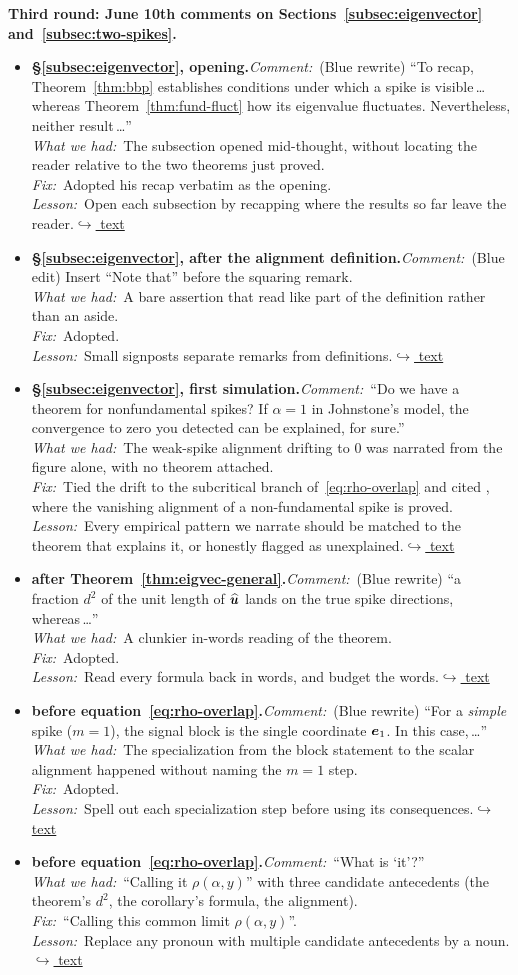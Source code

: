 \documentclass[12pt]{article}
\newcommand{\gdlogentry}[6]{%
  \item[\textcolor{thesisRev}{$\star$\,\ref{gdrev:#1}}]\hypertarget{gdlog:#1}{}%
  \textbf{#2.}\enspace\emph{Comment:}~#3\\
  \emph{What we had:}~#4\\
  \emph{Fix:}~#5\\
  \emph{Lesson:}~#6\enspace\hyperlink{gdtext:#1}{\textcolor{thesisLink}{$\hookrightarrow$ text}}}
\begin{document}
\medskip
\noindent\textbf{Third round: June 10th comments on Sections~\ref{subsec:eigenvector} and~\ref{subsec:two-spikes}.}
\begin{itemize}[leftmargin=2.4em,itemsep=0.55em]
\gdlogentry{r3-recap}{\S\ref{subsec:eigenvector}, opening}{(Blue rewrite) ``To recap, Theorem~\ref{thm:bbp} establishes conditions under which a spike is visible\,\dots whereas Theorem~\ref{thm:fund-fluct} how its eigenvalue fluctuates. Nevertheless, neither result\,\dots''}{The subsection opened mid-thought, without locating the reader relative to the two theorems just proved.}{Adopted his recap verbatim as the opening.}{Open each subsection by recapping where the results so far leave the reader.}

\gdlogentry{r3-notethat}{\S\ref{subsec:eigenvector}, after the alignment definition}{(Blue edit) Insert ``Note that'' before the squaring remark.}{A bare assertion that read like part of the definition rather than an aside.}{Adopted.}{Small signposts separate remarks from definitions.}

\gdlogentry{r3-nonfund-thm}{\S\ref{subsec:eigenvector}, first simulation}{``Do we have a theorem for nonfundamental spikes? If \(\alpha = 1\) in Johnstone's model, the convergence to zero you detected can be explained, for sure.''}{The weak-spike alignment drifting to \(0\) was narrated from the figure alone, with no theorem attached.}{Tied the drift to the subcritical branch of~\eqref{eq:rho-overlap} and cited \citet{Paul2007}, where the vanishing alignment of a non-fundamental spike is proved.}{Every empirical pattern we narrate should be matched to the theorem that explains it, or honestly flagged as unexplained.}

\gdlogentry{r3-fraction}{after Theorem~\ref{thm:eigvec-general}}{(Blue rewrite) ``a fraction \(d^2\) of the unit length of \(\widehat{\bm{u}}\) lands on the true spike directions, whereas\,\dots''}{A clunkier in-words reading of the theorem.}{Adopted.}{Read every formula back in words, and budget the words.}

\gdlogentry{r3-simple-spike}{before equation~\eqref{eq:rho-overlap}}{(Blue rewrite) ``For a \emph{simple} spike (\(m = 1\)), the signal block is the single coordinate \(\bm{e}_1\). In this case,\,\dots''}{The specialization from the block statement to the scalar alignment happened without naming the \(m = 1\) step.}{Adopted.}{Spell out each specialization step before using its consequences.}

\gdlogentry{r3-whatisit}{before equation~\eqref{eq:rho-overlap}}{``What is `it'?''}{``Calling it \(\rho(\alpha, y)\)'' with three candidate antecedents (the theorem's \(d^2\), the corollary's formula, the alignment).}{``Calling this common limit \(\rho(\alpha, y)\)''.}{Replace any pronoun with multiple candidate antecedents by a noun.}


\end{itemize}
\end{document}
